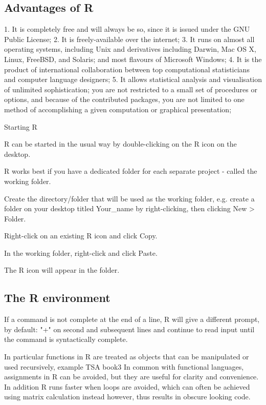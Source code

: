  
\subsection*{Advantages of R}

1. It is completely free and will always be so, since it is issued under the GNU Public License;
2. It is freely-available over the internet;
3. It runs on almost all operating systems, including Unix and derivatives including Darwin, Mac OS X, Linux, FreeBSD, and Solaris; and most flavours of Microsoft Windows;
4. It is the product of international collaboration between top computational statisticians and computer language designers;
5. It allows statistical analysis and visualisation of unlimited sophistication; you are not restricted to a small set of procedures or options, and because of the contributed packages, you are not limited to one method of accomplishing a given computation or graphical presentation;
 

Starting R


R can be started in the usual way by double-clicking on the R icon on the desktop.

R works best if you have a dedicated folder for each separate project - called the working folder.

Create the directory/folder that will be used as the working folder, e.g. create a folder on your desktop titled Your_name by right-clicking, then clicking New > Folder.

Right-click on an existing R icon and click Copy. 

In the working folder, right-click and click Paste. 

The R icon will appear in the folder.



\subsection*{The R environment}

 
 
If a command is not complete at the end of a line, R will give a different prompt, by default:
"+" on second and subsequent lines and continue to read input until the command is syntactically complete.
 
In particular functions in R are treated as objects that can be manipulated or used recursively, example TSA book3
In common with functional languages, assignments in R can be avoided, but they are useful for clarity and convenience. 
In addition R runs faster when loops are avoided, which can often be achieved using matrix calculation instead however, thus results in obscure looking code.
 



